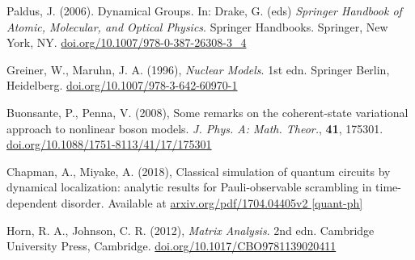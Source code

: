 \documentclass[12pt]{article}
\begin{document}
	\begin{thebibliography}{10}
	
	Paldus, J. (2006). Dynamical Groups. In: Drake, G. (eds) \textit{Springer Handbook of Atomic, Molecular, and Optical Physics}. Springer Handbooks. Springer, New York, NY. \href{https://doi.org/10.1007/978-0-387-26308-3\_4}{doi.org/10.1007/978-0-387-26308-3\_4}
	
	Greiner, W., Maruhn, J. A. (1996), \textit{Nuclear Models}. 1st edn. Springer Berlin, Heidelberg. \href{https://doi.org/10.1007/978-3-642-60970-1}{doi.org/10.1007/978-3-642-60970-1}
	
	Buonsante, P., Penna, V. (2008), Some remarks on the coherent-state variational approach to nonlinear boson models. \textit{J. Phys. A: Math. Theor.}, \textbf{41}, 175301. \href{https://doi.org/10.1088/1751-8113/41/17/175301}{doi.org/10.1088/1751-8113/41/17/175301}
	
	Chapman, A., Miyake, A. (2018), Classical simulation of quantum circuits by dynamical localization: analytic results for Pauli-observable scrambling in time-dependent disorder. Available at \href{https://arxiv.org/pdf/1704.04405v2}{arxiv.org/pdf/1704.04405v2 [quant-ph]}
	
	Horn, R. A., Johnson, C. R. (2012), \textit{Matrix Analysis}. 2nd edn. Cambridge University Press, Cambridge. \href{https://doi.org/10.1017/CBO9781139020411}{doi.org/10.1017/CBO9781139020411 }

	\end{thebibliography}	
	
\end{document}
